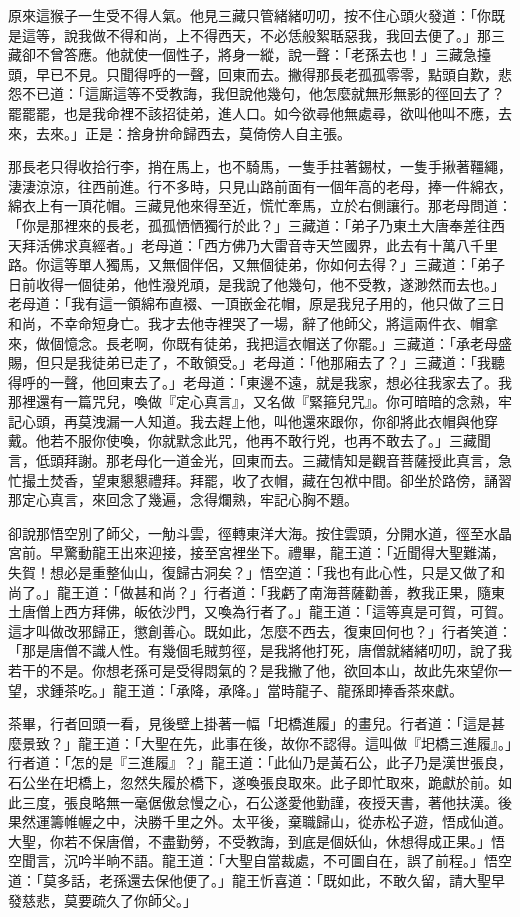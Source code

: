 原來這猴子一生受不得人氣。他見三藏只管緒緒叨叨，按不住心頭火發道：「你既是這等，說我做不得和尚，上不得西天，不必恁般絮聒惡我，我回去便了。」那三藏卻不曾答應。他就使一個性子，將身一縱，說一聲：「老孫去也！」三藏急擡頭，早已不見。只聞得呼的一聲，回東而去。撇得那長老孤孤零零，點頭自歎，悲怨不已道：「這廝這等不受教誨，我但說他幾句，他怎麼就無形無影的徑回去了？罷罷罷，也是我命裡不該招徒弟，進人口。如今欲尋他無處尋，欲叫他叫不應，去來，去來。」正是：捨身拚命歸西去，莫倚傍人自主張。

那長老只得收拾行李，捎在馬上，也不騎馬，一隻手拄著錫杖，一隻手揪著韁繩，淒淒涼涼，往西前進。行不多時，只見山路前面有一個年高的老母，捧一件綿衣，綿衣上有一頂花帽。三藏見他來得至近，慌忙牽馬，立於右側讓行。那老母問道：「你是那裡來的長老，孤孤恓恓獨行於此？」三藏道：「弟子乃東土大唐奉差往西天拜活佛求真經者。」老母道：「西方佛乃大雷音寺天竺國界，此去有十萬八千里路。你這等單人獨馬，又無個伴侶，又無個徒弟，你如何去得？」三藏道：「弟子日前收得一個徒弟，他性潑兇頑，是我說了他幾句，他不受教，遂渺然而去也。」老母道：「我有這一領綿布直裰、一頂嵌金花帽，原是我兒子用的，他只做了三日和尚，不幸命短身亡。我才去他寺裡哭了一場，辭了他師父，將這兩件衣、帽拿來，做個憶念。長老啊，你既有徒弟，我把這衣帽送了你罷。」三藏道：「承老母盛賜，但只是我徒弟已走了，不敢領受。」老母道：「他那廂去了？」三藏道：「我聽得呼的一聲，他回東去了。」老母道：「東邊不遠，就是我家，想必往我家去了。我那裡還有一篇咒兒，喚做『定心真言』，又名做『緊箍兒咒』。你可暗暗的念熟，牢記心頭，再莫洩漏一人知道。我去趕上他，叫他還來跟你，你卻將此衣帽與他穿戴。他若不服你使喚，你就默念此咒，他再不敢行兇，也再不敢去了。」三藏聞言，低頭拜謝。那老母化一道金光，回東而去。三藏情知是觀音菩薩授此真言，急忙撮土焚香，望東懇懇禮拜。拜罷，收了衣帽，藏在包袱中間。卻坐於路傍，誦習那定心真言，來回念了幾遍，念得爛熟，牢記心胸不題。

卻說那悟空別了師父，一觔斗雲，徑轉東洋大海。按住雲頭，分開水道，徑至水晶宮前。早驚動龍王出來迎接，接至宮裡坐下。禮畢，龍王道：「近聞得大聖難滿，失賀！想必是重整仙山，復歸古洞矣？」悟空道：「我也有此心性，只是又做了和尚了。」龍王道：「做甚和尚？」行者道：「我虧了南海菩薩勸善，教我正果，隨東土唐僧上西方拜佛，皈依沙門，又喚為行者了。」龍王道：「這等真是可賀，可賀。這才叫做改邪歸正，懲創善心。既如此，怎麼不西去，復東回何也？」行者笑道：「那是唐僧不識人性。有幾個毛賊剪徑，是我將他打死，唐僧就緒緒叨叨，說了我若干的不是。你想老孫可是受得悶氣的？是我撇了他，欲回本山，故此先來望你一望，求鍾茶吃。」龍王道：「承降，承降。」當時龍子、龍孫即捧香茶來獻。

茶畢，行者回頭一看，見後壁上掛著一幅「圯橋進履」的畫兒。行者道：「這是甚麼景致？」龍王道：「大聖在先，此事在後，故你不認得。這叫做『圯橋三進履』。」行者道：「怎的是『三進履』？」龍王道：「此仙乃是黃石公，此子乃是漢世張良，石公坐在圯橋上，忽然失履於橋下，遂喚張良取來。此子即忙取來，跪獻於前。如此三度，張良略無一毫倨傲怠慢之心，石公遂愛他勤謹，夜授天書，著他扶漢。後果然運籌帷幄之中，決勝千里之外。太平後，棄職歸山，從赤松子遊，悟成仙道。大聖，你若不保唐僧，不盡勤勞，不受教誨，到底是個妖仙，休想得成正果。」悟空聞言，沉吟半晌不語。龍王道：「大聖自當裁處，不可圖自在，誤了前程。」悟空道：「莫多話，老孫還去保他便了。」龍王忻喜道：「既如此，不敢久留，請大聖早發慈悲，莫要疏久了你師父。」


